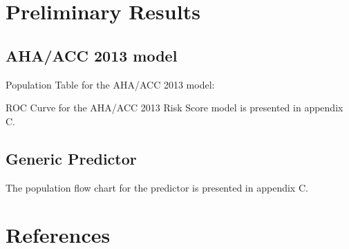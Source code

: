 \documentclass[a4paper,12pt]{article}
\begin{document}
	\section{Preliminary Results}

	\subsection{AHA/ACC 2013 model}

	Population Table for the AHA/ACC 2013 model\cite{Goff2014}:

	
	ROC Curve for the AHA/ACC 2013 Risk Score model is presented in appendix C.
	
	\subsection{Generic Predictor}
	
	The population flow chart for the predictor is presented in appendix C.
	
	\section{References}
	
   	\printbibliography[heading=none]
   	
\end{document}
